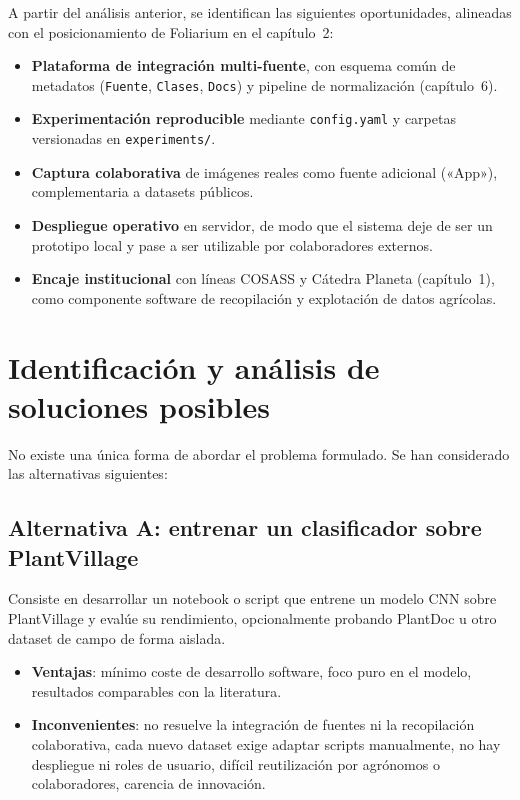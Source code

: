 \documentclass[11pt,spanish,listoffigures,listoftables]{tfgetsinf}
\begin{document}
A partir del análisis anterior, se identifican las siguientes oportunidades, alineadas con el posicionamiento de Foliarium en el capítulo~2:

\begin{itemize}
    \item \textbf{Plataforma de integración multi-fuente}, con esquema común de metadatos (\texttt{Fuente}, \texttt{Clases}, \texttt{Docs}) y pipeline de normalización (capítulo~6).
    \item \textbf{Experimentación reproducible} mediante \texttt{config.yaml} y carpetas versionadas en \texttt{experiments/}.
    \item \textbf{Captura colaborativa} de imágenes reales como fuente adicional («App»), complementaria a datasets públicos.
    \item \textbf{Despliegue operativo} en servidor, de modo que el sistema deje de ser un prototipo local y pase a ser utilizable por colaboradores externos.
    \item \textbf{Encaje institucional} con líneas COSASS y Cátedra Planeta (capítulo~1), como componente software de recopilación y explotación de datos agrícolas.
\end{itemize}

\section{Identificación y análisis de soluciones posibles}

No existe una única forma de abordar el problema formulado. Se han considerado las alternativas siguientes:

\subsection{Alternativa A: entrenar un clasificador sobre PlantVillage}

Consiste en desarrollar un notebook o script que entrene un modelo CNN sobre PlantVillage y evalúe su rendimiento, opcionalmente probando PlantDoc u otro dataset de campo de forma aislada.

\begin{itemize}
    \item \textbf{Ventajas}: mínimo coste de desarrollo software, foco puro en el modelo, resultados comparables con la literatura.
    \item \textbf{Inconvenientes}: no resuelve la integración de fuentes ni la recopilación colaborativa, cada nuevo dataset exige adaptar scripts manualmente, no hay despliegue ni roles de usuario, difícil reutilización por agrónomos o colaboradores, carencia de innovación.
\end{itemize}
\end{document}
